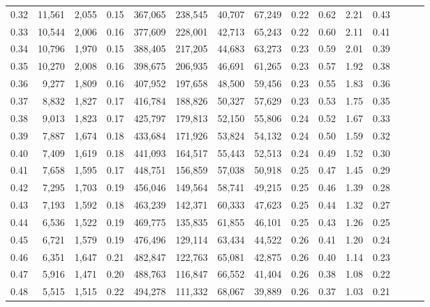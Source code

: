 \begin{tabular}{rrrrrrrrrrrrrrr}
0.32 &  11,561 &  2,055 &  0.15 &  367,065 &  238,545 &   40,707 &   67,249 &  0.22 &  0.62 &  2.21 &      0.43 \\
0.33 &  10,544 &  2,006 &  0.16 &  377,609 &  228,001 &   42,713 &   65,243 &  0.22 &  0.60 &  2.11 &      0.41 \\
0.34 &  10,796 &  1,970 &  0.15 &  388,405 &  217,205 &   44,683 &   63,273 &  0.23 &  0.59 &  2.01 &      0.39 \\
0.35 &  10,270 &  2,008 &  0.16 &  398,675 &  206,935 &   46,691 &   61,265 &  0.23 &  0.57 &  1.92 &      0.38 \\
0.36 &   9,277 &  1,809 &  0.16 &  407,952 &  197,658 &   48,500 &   59,456 &  0.23 &  0.55 &  1.83 &      0.36 \\
0.37 &   8,832 &  1,827 &  0.17 &  416,784 &  188,826 &   50,327 &   57,629 &  0.23 &  0.53 &  1.75 &      0.35 \\
0.38 &   9,013 &  1,823 &  0.17 &  425,797 &  179,813 &   52,150 &   55,806 &  0.24 &  0.52 &  1.67 &      0.33 \\
0.39 &   7,887 &  1,674 &  0.18 &  433,684 &  171,926 &   53,824 &   54,132 &  0.24 &  0.50 &  1.59 &      0.32 \\
0.40 &   7,409 &  1,619 &  0.18 &  441,093 &  164,517 &   55,443 &   52,513 &  0.24 &  0.49 &  1.52 &      0.30 \\
0.41 &   7,658 &  1,595 &  0.17 &  448,751 &  156,859 &   57,038 &   50,918 &  0.25 &  0.47 &  1.45 &      0.29 \\
0.42 &   7,295 &  1,703 &  0.19 &  456,046 &  149,564 &   58,741 &   49,215 &  0.25 &  0.46 &  1.39 &      0.28 \\
0.43 &   7,193 &  1,592 &  0.18 &  463,239 &  142,371 &   60,333 &   47,623 &  0.25 &  0.44 &  1.32 &      0.27 \\
0.44 &   6,536 &  1,522 &  0.19 &  469,775 &  135,835 &   61,855 &   46,101 &  0.25 &  0.43 &  1.26 &      0.25 \\
0.45 &   6,721 &  1,579 &  0.19 &  476,496 &  129,114 &   63,434 &   44,522 &  0.26 &  0.41 &  1.20 &      0.24 \\
0.46 &   6,351 &  1,647 &  0.21 &  482,847 &  122,763 &   65,081 &   42,875 &  0.26 &  0.40 &  1.14 &      0.23 \\
0.47 &   5,916 &  1,471 &  0.20 &  488,763 &  116,847 &   66,552 &   41,404 &  0.26 &  0.38 &  1.08 &      0.22 \\
0.48 &   5,515 &  1,515 &  0.22 &  494,278 &  111,332 &   68,067 &   39,889 &  0.26 &  0.37 &  1.03 &      0.21 \\

\end{tabular}
